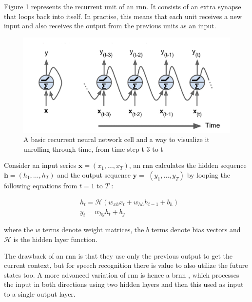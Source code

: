 Figure \ref{fig:rnn} represents the recurrent unit of an \acrshort{rnn}. It consists of an extra synapse that loops back into itself. In practise, this means that each unit receives a new input and also receives the output from the previous units as an input.
\begin{figure}[ht]
  \begin{center}
    \includegraphics[width=\textwidth]{images/rnn.png} 
    \caption{A basic recurrent neural network cell and a way to visualize it
unrolling through time, from time step t-3 to t \cite{Hagner2017RecurrentModel}}
    \label{fig:rnn}
  \end{center}
\end{figure}

Consider an input series $\boldsymbol{x}=\left(x_{1}, \ldots, x_{T}\right)$, an \acrshort{rnn} calculates the hidden sequence $\boldsymbol{h}=\left(h_{1}, \ldots, h_{T}\right)$ and the output sequence $\boldsymbol{y}=$ $\left(y_{1}, \ldots, y_{T}\right)$ by looping the following equations from $t=1$ to $T$ :

$$
\begin{aligned}
&h_{t}=\mathcal{H}\left(w_{xh} x_{t}+w_{hh} h_{t-1}+b_{h}\right) \\
&y_{t}=w_{h y} h_{t}+b_{y}
\end{aligned}
$$

where the $w$ terms denote weight matrices, the $b$ terms denote bias vectors and $\mathcal{H}$ is the hidden layer function. \cite{Graves2013SpeechNetworks}

The drawback of an \acrshort{rnn} is that they use only the previous output to get the current context, but for speech recognition there is value to also utilize the future states too. A more advanced variation of \acrshort{rnn} is hence a \acrfull{brnn} \cite{Schuster1997BidirectionalNetworks}, which processes the input in both directions using two hidden layers and then this used as input to a single output layer. 

